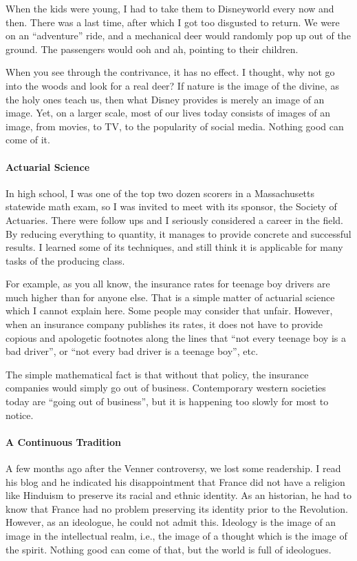 When the kids were young, I had to take them to Disneyworld every now and then. There was a last time, after which I got too disgusted to return. We were on an ``adventure'' ride, and a mechanical deer would randomly pop up out of the ground. The passengers would ooh and ah, pointing to their children.

When you see through the contrivance, it has no effect. I thought, why not go into the woods and look for a real deer? If nature is the image of the divine, as the holy ones teach us, then what Disney provides is merely an image of an image. Yet, on a larger scale, most of our lives today consists of images of an image, from movies, to TV, to the popularity of social media. Nothing good can come of it.

\paragraph{Actuarial Science}


In high school, I was one of the top two dozen scorers in a Massachusetts statewide math exam, so I was invited to meet with its sponsor, the Society of Actuaries. There were follow ups and I seriously considered a career in the field. By reducing everything to quantity, it manages to provide concrete and successful results. I learned some of its techniques, and still think it is applicable for many tasks of the producing class.

For example, as you all know, the insurance rates for teenage boy drivers are much higher than for anyone else. That is a simple matter of actuarial science which I cannot explain here. Some people may consider that unfair. However, when an insurance company publishes its rates, it does not have to provide copious and apologetic footnotes along the lines that ``not every teenage boy is a bad driver'', or ``not every bad driver is a teenage boy'', etc.

The simple mathematical fact is that without that policy, the insurance companies would simply go out of business. Contemporary western societies today are ``going out of business'', but it is happening too slowly for most to notice.

\paragraph{A Continuous Tradition}


A few months ago after the Venner controversy, we lost some readership. I read his blog and he indicated his disappointment that France did not have a religion like Hinduism to preserve its racial and ethnic identity. As an historian, he had to know that France had no problem preserving its identity prior to the Revolution. However, as an ideologue, he could not admit this. Ideology is the image of an image in the intellectual realm, i.e., the image of a thought which is the image of the spirit. Nothing good can come of that, but the world is full of ideologues.

